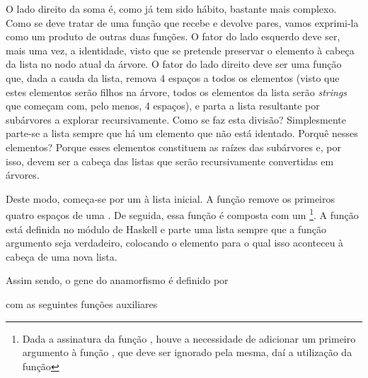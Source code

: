 \documentclass[a4paper]{article}
\begin{document}
O lado direito da soma é, como já tem sido hábito, bastante mais complexo. Como se deve tratar de uma função que recebe e devolve pares, vamos exprimi-la como um produto de outras duas funções. O fator do lado esquerdo deve ser, mais uma vez, a identidade, visto que se pretende preservar o elemento à cabeça da lista no nodo atual da árvore. O fator do lado direito deve ser uma função que, dada a cauda da lista, remova 4 espaços a todos os elementos (visto que estes elementos serão filhos na árvore, todos os elementos da lista serão \textit{strings} que começam com, pelo menos, 4 espaços), e parta a lista resultante por subárvores a explorar recursivamente. Como se faz esta divisão? Simplesmente parte-se a lista sempre que há um elemento que não está identado. Porquê nesses elementos? Porque esses elementos constituem as raízes das subárvores e, por isso, devem ser a cabeça das listas que serão recursivamente convertidas em árvores.

Deste modo, começa-se por um  à lista inicial. A função  remove os primeiros quatro espaços de uma . De seguida, essa função é composta com um \footnote{Dada a assinatura da função , houve a necessidade de adicionar um primeiro argumento à função , que deve ser ignorado pela mesma, daí a utilização da função }. A função  está definida no módulo de Haskell  e parte uma lista sempre que a função argumento seja verdadeiro, colocando o elemento para o qual isso aconteceu à cabeça de uma nova lista.

Assim sendo, o gene do anamorfismo é definido por


com as seguintes funções auxiliares

\end{document}
